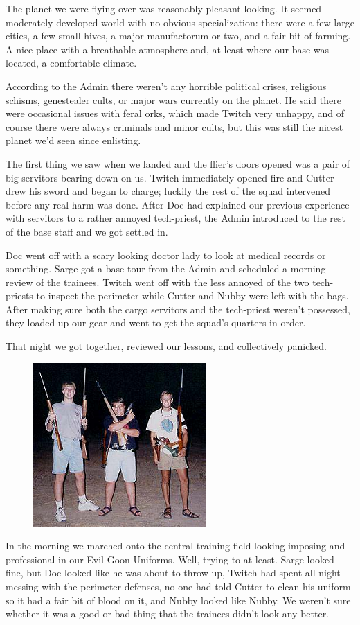 The planet we were flying over was reasonably pleasant looking. 
It seemed moderately developed world with no obvious specialization: 
there were a few large cities, a few small hives, a major manufactorum or two, and a fair bit of farming. 
A nice place with a breathable atmosphere and, at least where our base was located, a comfortable climate.

According to the Admin there weren’t any horrible political crises, religious schisms, genestealer cults, or major wars currently on the planet. 
He said there were occasional issues with feral orks, which made Twitch very unhappy, and of course there were always criminals and minor cults, but this was still the nicest planet we’d seen since enlisting.

The first thing we saw when we landed and the flier’s doors opened was a pair of big servitors bearing down on us. 
Twitch immediately opened fire and Cutter drew his sword and began to charge; 
luckily the rest of the squad intervened before any real harm was done. 
After Doc had explained our previous experience with servitors to a rather annoyed tech-priest, the Admin introduced to the rest of the base staff and we got settled in.

Doc went off with a scary looking doctor lady to look at medical records or something. 
Sarge got a base tour from the Admin and scheduled a morning review of the trainees. 
Twitch went off with the less annoyed of the two tech-priests to inspect the perimeter while Cutter and Nubby were left with the bags. 
After making sure both the cargo servitors and the tech-priest weren’t possessed, they loaded up our gear and went to get the squad’s quarters in order.

That night we got together, reviewed our lessons, and collectively panicked.

\begin{figure}
	\begin{center}
		\includegraphics[width=\figwidth]{pics/8/9.png}
	\end{center}
\end{figure}
In the morning we marched onto the central training field looking imposing and professional in our Evil Goon Uniforms. 
Well, trying to at least. 
Sarge looked fine, but Doc looked like he was about to throw up, Twitch had spent all night messing with the perimeter defenses, no one had told Cutter to clean his uniform so it had a fair bit of blood on it, and Nubby looked like Nubby. 
We weren’t sure whether it was a good or bad thing that the trainees didn’t look any better.

